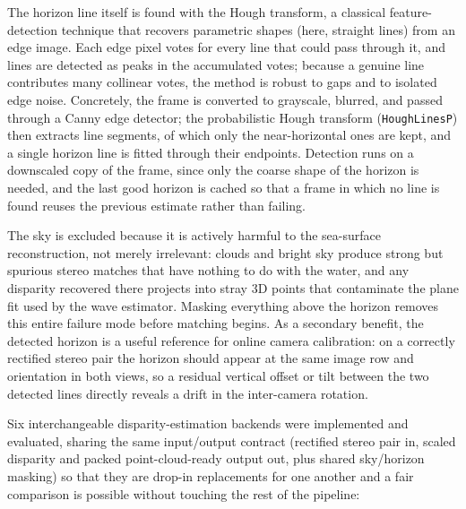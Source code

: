 The horizon line itself is found with the Hough transform, a classical feature-detection technique that recovers parametric shapes (here, straight lines) from an edge image. Each edge pixel votes for every line that could pass through it, and lines are detected as peaks in the accumulated votes; because a genuine line contributes many collinear votes, the method is robust to gaps and to isolated edge noise. Concretely, the frame is converted to grayscale, blurred, and passed through a Canny edge detector; the probabilistic Hough transform (\texttt{HoughLinesP}) then extracts line segments, of which only the near-horizontal ones are kept, and a single horizon line is fitted through their endpoints. Detection runs on a downscaled copy of the frame, since only the coarse shape of the horizon is needed, and the last good horizon is cached so that a frame in which no line is found reuses the previous estimate rather than failing.

The sky is excluded because it is actively harmful to the sea-surface reconstruction, not merely irrelevant: clouds and bright sky produce strong but spurious stereo matches that have nothing to do with the water, and any disparity recovered there projects into stray 3D points that contaminate the plane fit used by the wave estimator. Masking everything above the horizon removes this entire failure mode before matching begins. As a secondary benefit, the detected horizon is a useful reference for online camera calibration: on a correctly rectified stereo pair the horizon should appear at the same image row and orientation in both views, so a residual vertical offset or tilt between the two detected lines directly reveals a drift in the inter-camera rotation.

Six interchangeable disparity-estimation backends were implemented and evaluated, sharing the same input/output contract (rectified stereo pair in, scaled disparity and packed point-cloud-ready output out, plus shared sky/horizon masking) so that they are drop-in replacements for one another and a fair comparison is possible without touching the rest of the pipeline:

